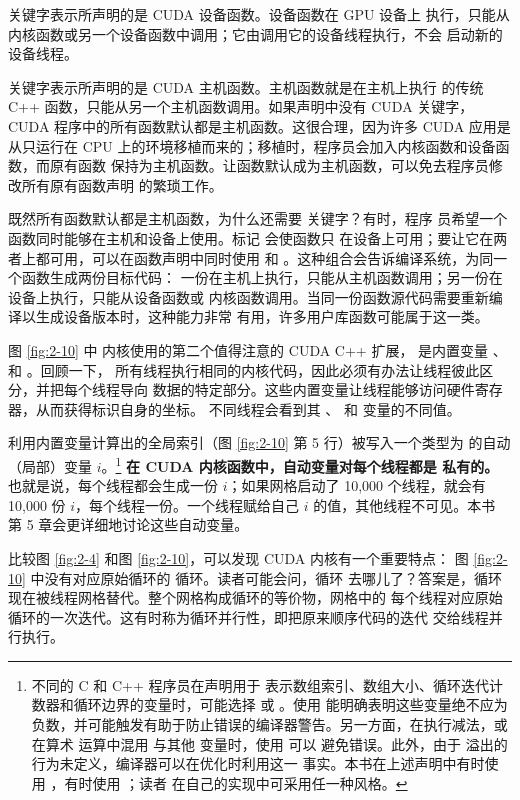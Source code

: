  关键字表示所声明的是 CUDA 设备函数。设备函数在 GPU 设备上
执行，只能从内核函数或另一个设备函数中调用；它由调用它的设备线程执行，不会
启动新的设备线程。

 关键字表示所声明的是 CUDA 主机函数。主机函数就是在主机上执行
的传统 C++ 函数，只能从另一个主机函数调用。如果声明中没有 CUDA 关键字，CUDA
程序中的所有函数默认都是主机函数。这很合理，因为许多 CUDA 应用是从只运行在
CPU 上的环境移植而来的；移植时，程序员会加入内核函数和设备函数，而原有函数
保持为主机函数。让函数默认成为主机函数，可以免去程序员修改所有原有函数声明
的繁琐工作。

既然所有函数默认都是主机函数，为什么还需要  关键字？有时，程序
员希望一个函数同时能够在主机和设备上使用。标记  会使函数只
在设备上可用；要让它在两者上都可用，可以在函数声明中同时使用 
和 。这种组合会告诉编译系统，为同一个函数生成两份目标代码：
一份在主机上执行，只能从主机函数调用；另一份在设备上执行，只能从设备函数或
内核函数调用。当同一份函数源代码需要重新编译以生成设备版本时，这种能力非常
有用，许多用户库函数可能属于这一类。

图 \ref{fig:2-10} 中  内核使用的第二个值得注意的 CUDA C++ 扩展，
是内置变量 、 和 。回顾一下，
所有线程执行相同的内核代码，因此必须有办法让线程彼此区分，并把每个线程导向
数据的特定部分。这些内置变量让线程能够访问硬件寄存器，从而获得标识自身的坐标。
不同线程会看到其 、 和 
变量的不同值。

利用内置变量计算出的全局索引（图 \ref{fig:2-10} 第 5 行）被写入一个类型为
 的自动（局部）变量 $i$。\footnote{不同的 C 和 C++ 程序员在声明用于
表示数组索引、数组大小、循环迭代计数器和循环边界的变量时，可能选择 
或 。使用  能明确表明这些变量绝不应为
负数，并可能触发有助于防止错误的编译器警告。另一方面，在执行减法，或在算术
运算中混用  与其他  变量时，使用  可以
避免错误。此外，由于  溢出的行为未定义，编译器可以在优化时利用这一
事实。本书在上述声明中有时使用 ，有时使用 ；读者
在自己的实现中可采用任一种风格。} \textbf{在 CUDA 内核函数中，自动变量对每个线程都是
私有的。}
也就是说，每个线程都会生成一份 $i$；如果网格启动了 10,000 个线程，就会有
10,000 份 $i$，每个线程一份。一个线程赋给自己 $i$ 的值，其他线程不可见。本书
第 5 章会更详细地讨论这些自动变量。

比较图 \ref{fig:2-4} 和图 \ref{fig:2-10}，可以发现 CUDA 内核有一个重要特点：
图 \ref{fig:2-10} 中没有对应原始循环的  循环。读者可能会问，循环
去哪儿了？答案是，循环现在被线程网格替代。整个网格构成循环的等价物，网格中的
每个线程对应原始循环的一次迭代。这有时称为循环并行性，即把原来顺序代码的迭代
交给线程并行执行。

